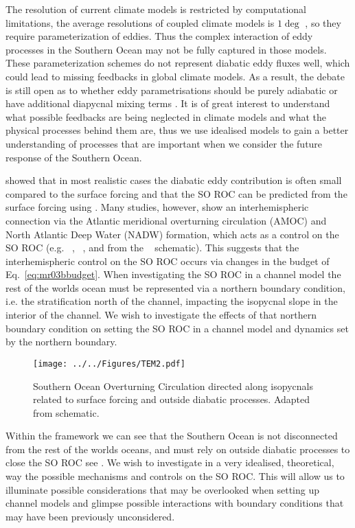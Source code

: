The resolution of current climate models is restricted by computational limitations, the average resolutions of coupled climate models is $\displaystyle{1 \deg}$ \cite{}, so they require parameterization of eddies. Thus the complex interaction of eddy processes in the Southern Ocean may not be fully captured in those models. These parameterization schemes do not represent diabatic eddy fluxes well, which could lead to missing feedbacks in global climate models. As a result, the debate is still open as to whether eddy parametrisations should be purely adiabatic or have additional diapycnal mixing terms \citep{Gent2011a}. It is of great interest to understand what possible feedbacks are being neglected in climate models and what the physical processes behind them are, thus we use idealised models to gain a better understanding of processes that are important when we consider the future response of the Southern Ocean. 

\citet{Marshall2003} showed that in most realistic cases the diabatic eddy contribution is often small compared to the surface forcing and that the SO ROC can be predicted from the surface forcing using . Many studies, however, show an interhemispheric connection via the Atlantic meridional overturning circulation (AMOC) and North Atlantic Deep Water (NADW) formation, which acts as a control on the SO ROC (e.g. ~\citet{Wolfe2009}, ~\citet{Nikurashin2012a}, and from the ~\cite{Marshall2003} schematic).  This suggests that the interhemispheric control on the SO ROC occurs via changes in the budget of Eq.~\ref{eq:mr03bbudget}. When investigating the SO ROC in a channel model the rest of the worlds ocean must be represented via a northern boundary condition, i.e. the stratification north of the channel, impacting the isopycnal slope in the interior of the channel. We wish to investigate the effects of that northern boundary condition on setting the SO ROC in a channel model and dynamics set by the northern boundary. 

\begin{figure}
\noindent \texttt{[image: ../../Figures/TEM2.pdf]}
\caption{Southern Ocean Overturning Circulation directed along isopycnals related to surface forcing and outside diabatic processes. Adapted from  schematic.}
\label{fig:MR03scheme}
\end{figure}

Within the \citet{Marshall2003} framework we can see that the Southern Ocean is not disconnected from the rest of the worlds oceans, and must rely on outside diabatic processes to close the SO ROC see . We wish to investigate in a very idealised, theoretical, way the possible mechanisms and controls on the SO ROC. This will allow us to illuminate possible considerations that may be overlooked when setting up channel models and glimpse possible interactions with boundary conditions that may have been previously unconsidered.

